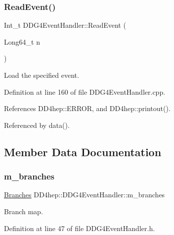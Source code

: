 \subsubsection{\texorpdfstring{Read\+Event()}{ReadEvent()}}
{\footnotesize\ttfamily Int\+\_\+t D\+D\+G4\+Event\+Handler\+::\+Read\+Event (\begin{DoxyParamCaption}\item[{Long64\+\_\+t}]{n }\end{DoxyParamCaption})}



Load the specified event. 



Definition at line 160 of file D\+D\+G4\+Event\+Handler.\+cpp.



References D\+D4hep\+::\+E\+R\+R\+OR, and D\+D4hep\+::printout().



Referenced by data().



\subsection{Member Data Documentation}
\hypertarget{class_d_d4hep_1_1_d_d_g4_event_handler_a33ae5f13b50b604cf914ba4d86aa3c35}{}\label{class_d_d4hep_1_1_d_d_g4_event_handler_a33ae5f13b50b604cf914ba4d86aa3c35} 
\subsubsection{\texorpdfstring{m\+\_\+branches}{m\_branches}}
{\footnotesize\ttfamily \hyperlink{class_d_d4hep_1_1_d_d_g4_event_handler_accd112cdbf8673e3a80d97e2d5c98241}{Branches} D\+D4hep\+::\+D\+D\+G4\+Event\+Handler\+::m\+\_\+branches\hspace{0.3cm}{\ttfamily [protected]}}



Branch map. 



Definition at line 47 of file D\+D\+G4\+Event\+Handler.\+h.

\hypertarget{class_d_d4hep_1_1_d_d_g4_event_handler_a11dcb61378ef3044f34723cc25aec8b7}{}\label{class_d_d4hep_1_1_d_d_g4_event_handler_a11dcb61378ef3044f34723cc25aec8b7} 
